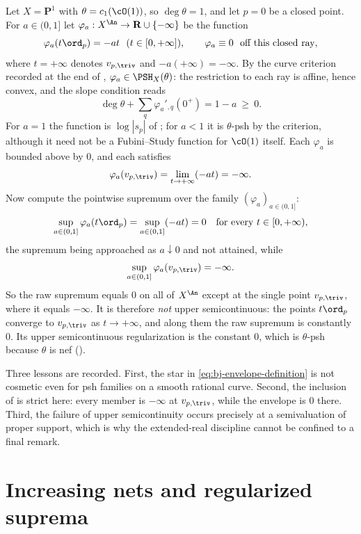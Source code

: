 \begin{example}
\label{ex:ch45-raw-sup-not-usc}
Let $X=\mathbf P^1$ with $\theta=c_1(\cO(1))$, so $\deg\theta=1$, and
let $p=0$ be a closed point.  For $a\in(0,1]$ let
$\varphi_a:X^{\An}\to\mathbf R\cup\{-\infty\}$ be the function
\[
 \varphi_a(t\ord_p)=-at\ \ (t\in[0,+\infty]),
 \qquad
 \varphi_a\equiv0\ \text{ off this closed ray},
\]
where $t=+\infty$ denotes $v_{p,\triv}$ and $-a(+\infty)=-\infty$.
By the curve criterion recorded at the end of
, $\varphi_a\in\PSH_X(\theta)$: the
restriction to each ray is affine, hence convex, and the slope condition
reads
\[
 \deg\theta+\sum_q\varphi_a'{}_{,q}(0^+)=1-a\ \ge\ 0 .
\]
For $a=1$ the function is $\log|s_p|$ of
; for $a<1$ it is $\theta$-psh by the
criterion, although it need not be a Fubini--Study function for
$\cO(1)$ itself.  Each $\varphi_a$ is bounded above by $0$, and each
satisfies
\[
 \varphi_a(v_{p,\triv})=\lim_{t\to+\infty}(-at)=-\infty .
\]
Now compute the pointwise supremum over the family $(\varphi_a)_{a\in(0,1]}$:
\[
 \sup_{a\in(0,1]}\varphi_a(t\ord_p)
 =\sup_{a\in(0,1]}(-at)=0
 \quad\text{for every }t\in[0,+\infty),
\]
the supremum being approached as $a\downarrow0$ and not attained, while
\[
 \sup_{a\in(0,1]}\varphi_a(v_{p,\triv})=-\infty .
\]
So the raw supremum equals $0$ on all of $X^{\An}$ except at the single
point $v_{p,\triv}$, where it equals $-\infty$.  It is therefore
\emph{not} upper semicontinuous: the points $t\ord_p$ converge to
$v_{p,\triv}$ as $t\to+\infty$, and along them the raw supremum is
constantly $0$.  Its upper semicontinuous regularization is the constant
$0$, which is $\theta$-psh because $\theta$ is nef
().

Three lessons are recorded.  First, the star in
\eqref{eq:bj-envelope-definition} is not cosmetic even for psh families on a
smooth rational curve.  Second, the inclusion of
 is strict here: every member is $-\infty$ at
$v_{p,\triv}$, while the envelope is $0$ there.  Third, the failure of
upper semicontinuity occurs precisely at a semivaluation of proper support,
which is why the extended-real discipline cannot be confined to a final
remark.
\end{example}

\section{Increasing nets and regularized suprema}
\label{sec:ch45-nets}

